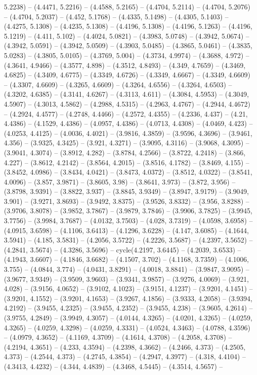 5.2238) -- (4.4471, 5.2216) -- (4.4588, 5.2165) -- (4.4704, 5.2114) -- (4.4704, 5.2076) -- (4.4704, 5.2037) -- (4.452, 5.1768) -- (4.4335, 5.1498) -- (4.4305, 5.1403) -- (4.4275, 5.1308) -- (4.4235, 5.1308) -- (4.4196, 5.1308) -- (4.4196, 5.1263) -- (4.4196, 5.1219) -- (4.411, 5.102) -- (4.4024, 5.0821) -- (4.3983, 5.0748) -- (4.3942, 5.0674) -- (4.3942, 5.0591) -- (4.3942, 5.0509) -- (4.3903, 5.0485) -- (4.3865, 5.0461) -- (4.3835, 5.0283) -- (4.3805, 5.0105) -- (4.3769, 5.004) -- (4.3734, 4.9974) -- (4.3688, 4.972) -- (4.3641, 4.9466) -- (4.3577, 4.898) -- (4.3512, 4.8493) -- (4.349, 4.7659) -- (4.3469, 4.6825) -- (4.3409, 4.6775) -- (4.3349, 4.6726) -- (4.3349, 4.6667) -- (4.3349, 4.6609) -- (4.3307, 4.6609) -- (4.3265, 4.6609) -- (4.3264, 4.6556) -- (4.3264, 4.6503) -- (4.3202, 4.6385) -- (4.3141, 4.6267) -- (4.3113, 4.611) -- (4.3084, 4.5953) -- (4.3049, 4.5907) -- (4.3013, 4.5862) -- (4.2988, 4.5315) -- (4.2963, 4.4767) -- (4.2944, 4.4672) -- (4.2924, 4.4577) -- (4.2748, 4.4466) -- (4.2572, 4.4355) -- (4.2336, 4.437) -- (4.21, 4.4386) -- (4.1529, 4.4386) -- (4.0957, 4.4386) -- (4.0713, 4.4308) -- (4.0469, 4.423) -- (4.0253, 4.4125) -- (4.0036, 4.4021) -- (3.9816, 4.3859) -- (3.9596, 4.3696) -- (3.9461, 4.356) -- (3.9325, 4.3425) -- (3.921, 4.3271) -- (3.9095, 4.3116) -- (3.9068, 4.3095) -- (3.9041, 4.3074) -- (3.8912, 4.282) -- (3.8784, 4.2566) -- (3.8722, 4.2418) -- (3.866, 4.227) -- (3.8612, 4.2142) -- (3.8564, 4.2015) -- (3.8516, 4.1782) -- (3.8469, 4.155) -- (3.8452, 4.0986) -- (3.8434, 4.0421) -- (3.8473, 4.0372) -- (3.8512, 4.0322) -- (3.8541, 4.0096) -- (3.857, 3.9871) -- (3.8605, 3.98) -- (3.8641, 3.973) -- (3.872, 3.956) -- (3.8798, 3.9391) -- (3.8822, 3.937) -- (3.8845, 3.9349) -- (3.8947, 3.9179) -- (3.9049, 3.901) -- (3.9271, 3.8693) -- (3.9492, 3.8375) -- (3.9526, 3.8332) -- (3.956, 3.8288) -- (3.9706, 3.8078) -- (3.9852, 3.7867) -- (3.9879, 3.7846) -- (3.9906, 3.7825) -- (3.9945, 3.7756) -- (3.9984, 3.7687) -- (4.0132, 3.7503) -- (4.028, 3.7319) -- (4.0598, 3.6958) -- (4.0915, 3.6598) -- (4.1106, 3.6413) -- (4.1296, 3.6228) -- (4.147, 3.6085) -- (4.1644, 3.5941) -- (4.185, 3.5831) -- (4.2056, 3.5722) -- (4.2226, 3.5687) -- (4.2397, 3.5652) -- (4.2841, 3.5674) -- (4.3286, 3.5696) -- cycle(4.2197, 3.6445) -- (4.2039, 3.6533) -- (4.1943, 3.6607) -- (4.1846, 3.6682) -- (4.1507, 3.702) -- (4.1168, 3.7359) -- (4.1006, 3.755) -- (4.0844, 3.774) -- (4.0431, 3.8291) -- (4.0018, 3.8841) -- (3.9847, 3.9095) -- (3.9677, 3.9349) -- (3.9509, 3.9603) -- (3.9341, 3.9857) -- (3.9276, 4.0069) -- (3.921, 4.028) -- (3.9156, 4.0652) -- (3.9102, 4.1023) -- (3.9151, 4.1237) -- (3.9201, 4.1451) -- (3.9201, 4.1552) -- (3.9201, 4.1653) -- (3.9267, 4.1856) -- (3.9333, 4.2058) -- (3.9394, 4.2192) -- (3.9455, 4.2325) -- (3.9455, 4.2352) -- (3.9455, 4.238) -- (3.9605, 4.2614) -- (3.9755, 4.2849) -- (3.9949, 4.3057) -- (4.0144, 4.3265) -- (4.0201, 4.3265) -- (4.0259, 4.3265) -- (4.0259, 4.3298) -- (4.0259, 4.3331) -- (4.0524, 4.3463) -- (4.0788, 4.3596) -- (4.0979, 4.3652) -- (4.1169, 4.3709) -- (4.1614, 4.3708) -- (4.2058, 4.3708) -- (4.2194, 4.3651) -- (4.233, 4.3594) -- (4.2398, 4.3662) -- (4.2466, 4.373) -- (4.2505, 4.373) -- (4.2544, 4.373) -- (4.2745, 4.3854) -- (4.2947, 4.3977) -- (4.318, 4.4104) -- (4.3413, 4.4232) -- (4.344, 4.4839) -- (4.3468, 4.5445) -- (4.3514, 4.5657) -- 